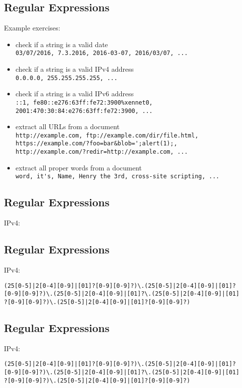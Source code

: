 \documentclass[xga]{xdvislides}
\begin{document}
\subsection{Regular Expressions}
Example exercises:
\begin{itemize}
	\item check if a string is a valid date \\
		\verb+03/07/2016, 7.3.2016, 2016-03-07, 2016/03/07, ...+
	\item check if a string is a valid IPv4 address \\
		\verb+0.0.0.0, 255.255.255.255, ...+
	\item check if a string is a valid IPv6 address \\
		\verb+::1, fe80::e276:63ff:fe72:3900%xennet0, 2001:470:30:84:e276:63ff:fe72:3900, ...+
	\item extract all URLs from a document \\
		\verb+http://example.com, ftp://example.com/dir/file.html,+ \\
		\verb+https://example.com/?foo=bar&blob=';alert(1);,+ \\
		\verb+http://example.com/?redir=http://example.com, ...+
	\item extract all proper words from a document \\
		\verb+word, it's, Name, Henry the 3rd, cross-site scripting, ...+
\end{itemize}

\subsection{Regular Expressions}
IPv4:

\subsection{Regular Expressions}
IPv4:
\begin{verbatim}
(25[0-5]|2[0-4][0-9]|[01]?[0-9][0-9]?)\.(25[0-5]|2[0-4][0-9]|[01]?
[0-9][0-9]?)\.(25[0-5]|2[0-4][0-9]|[01]?\.(25[0-5]|2[0-4][0-9]|[01]
?[0-9][0-9]?)\.(25[0-5]|2[0-4][0-9]|[01]?[0-9][0-9]?)
\end{verbatim}

\subsection{Regular Expressions}
IPv4:
\begin{verbatim}
(25[0-5]|2[0-4][0-9]|[01]?[0-9][0-9]?)\.(25[0-5]|2[0-4][0-9]|[01]?
[0-9][0-9]?)\.(25[0-5]|2[0-4][0-9]|[01]?\.(25[0-5]|2[0-4][0-9]|[01]
?[0-9][0-9]?)\.(25[0-5]|2[0-4][0-9]|[01]?[0-9][0-9]?)
\end{verbatim}
\end{document}
